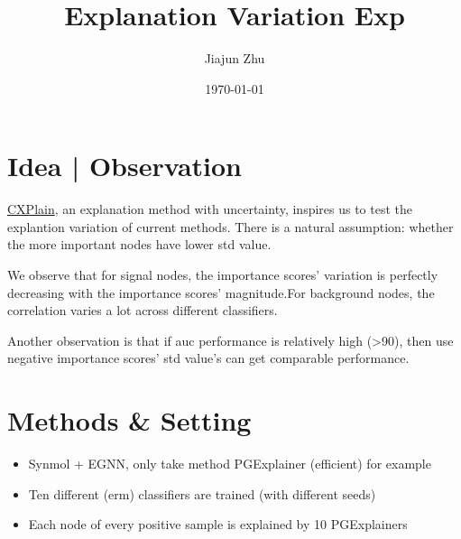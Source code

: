 \documentclass[portrait]{poster}%
\title{Explanation Variation Exp}%
\author{Jiajun Zhu}%
\date{\today}%
\begin{document}
%
\large%
\maketitle%
\printheader%
\begin{multicols}{2}%
\section*{Idea | Observation}%
\label{sec:Idea|Observation}%
\href{https://arxiv.org/abs/1910.12336}{CXPlain}, an explanation method with uncertainty, inspires us to test the explantion variation of current methods. There is a natural assumption: whether the more important nodes have lower std value.   \par  We observe that for signal nodes, the importance scores' variation is perfectly decreasing with the importance scores' magnitude.For background nodes, the correlation varies a lot across different classifiers.   \par Another observation is that if auc performance is relatively high (>90), then use negative importance scores' std value's can get comparable performance. 

%
\section*{Methods \& Setting}%
\label{sec:MethodsSetting}%
\begin{itemize}%
\item%
Synmol + EGNN, only take method PGExplainer (efficient) for example %
\item%
Ten different (erm) classifiers are trained (with different seeds)%
\item%
Each node of every positive sample is explained by 10 PGExplainers%
\end{itemize}

%

\end{multicols}
\end{document}
